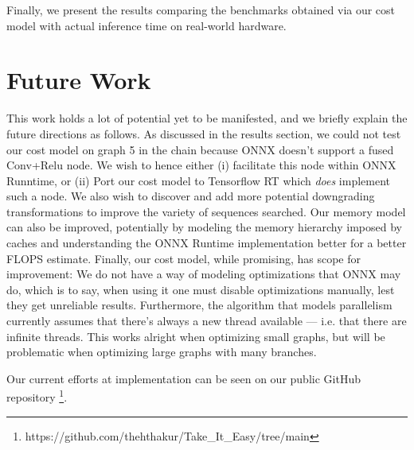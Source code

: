 \documentclass[12pt,a4paper,twoside,openright,bibliography=totocnumbered]{report}
\begin{document}
Finally, we present the results comparing the benchmarks obtained via our cost model with actual inference time on real-world hardware.

\section{Future Work}
This work holds a lot of potential yet to be manifested, and we briefly explain the future directions as follows.
As discussed in the results section, we could not test our cost model on graph 5 in the chain because ONNX doesn't support a fused Conv+Relu node. We wish to hence either (i) facilitate this node within ONNX Runntime, or (ii) Port our cost model to Tensorflow RT which \textit{does} implement such a node. We also wish to discover and add more potential downgrading transformations to improve the variety of sequences searched. Our memory model can also be improved, potentially by modeling the memory hierarchy imposed by caches and understanding the ONNX Runtime implementation better for a better FLOPS estimate. Finally, our cost model, while promising, has scope for improvement: We do not have a way of modeling optimizations that ONNX may do, which is to say, when using it one must disable optimizations manually, lest they get unreliable results. Furthermore, the algorithm that models parallelism currently assumes that there's always a new thread available --- i.e. that there are infinite threads. This works alright when optimizing small graphs, but will be problematic when optimizing large graphs with many branches.

Our current efforts at implementation can be seen on our public GitHub repository \footnote{https://github.com/thehthakur/Take\_It\_Easy/tree/main}.
    
\end{document}
